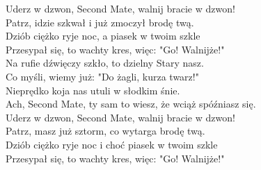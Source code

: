 Uderz w dzwon, Second Mate, walnij bracie w dzwon! \\
Patrz, idzie szkwał i już zmoczył brodę twą. \\
Dziób ciężko ryje noc, a piasek w twoim szkle \\
Przesypał się, to wachty kres, więc: "Go! Walnijże!" \\

Na rufie dźwięczy szkło, to dzielny Stary nasz. \\
Co myśli, wiemy już: "Do żagli, kurza twarz!" \\
Nieprędko koja nas utuli w słodkim śnie. \\
Ach, Second Mate, ty sam to wiesz, że wciąż spóźniasz się. \\

Uderz w dzwon, Second Mate, walnij bracie w dzwon! \\
Patrz, masz już sztorm, co wytarga brodę twą. \\
Dziób ciężko ryje noc i choć piasek w twoim szkle \\
Przesypał się, to wachty kres, więc: "Go! Walnijże!"  \\